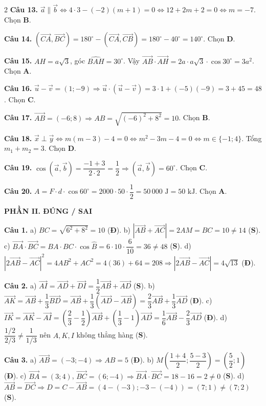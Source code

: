 \documentclass[10pt,a4paper]{article}
\begin{document}
\begin{multicols}{2}
\textbf{Câu 13.} $\vec{a} \parallel \vec{b} \Leftrightarrow 4\cdot 3 - (-2)(m + 1) = 0 \Leftrightarrow 12 + 2m + 2 = 0 \Leftrightarrow m = -7$. Chọn \textbf{B}.

\textbf{Câu 14.} $(\vec{CA}, \vec{BC}) = 180^\circ - (\vec{CA}, \vec{CB}) = 180^\circ - 40^\circ = 140^\circ$. Chọn \textbf{D}.

\textbf{Câu 15.} $AH = a\sqrt{3}$, góc $\widehat{BAH} = 30^\circ$. Vậy $\vec{AB}\cdot\vec{AH} = 2a\cdot a\sqrt{3}\cdot\cos 30^\circ = 3a^2$. Chọn \textbf{A}.

\textbf{Câu 16.} $\vec{u} - \vec{v} = (1; -9) \Rightarrow \vec{u}\cdot(\vec{u} - \vec{v}) = 3\cdot 1 + (-5)(-9) = 3 + 45 = 48$. Chọn \textbf{C}.

\textbf{Câu 17.} $\vec{AB} = (-6; 8) \Rightarrow AB = \sqrt{(-6)^2 + 8^2} = 10$. Chọn \textbf{B}.

\textbf{Câu 18.} $\vec{x}\perp\vec{y} \Leftrightarrow m(m - 3) - 4 = 0 \Leftrightarrow m^2 - 3m - 4 = 0 \Leftrightarrow m \in \{-1; 4\}$. Tổng $m_1 + m_2 = 3$. Chọn \textbf{D}.

\textbf{Câu 19.} $\cos(\vec{a}, \vec{b}) = \dfrac{-1 + 3}{2\cdot 2} = \dfrac{1}{2} \Rightarrow (\vec{a}, \vec{b}) = 60^\circ$. Chọn \textbf{C}.

\textbf{Câu 20.} $A = F\cdot d\cdot \cos 60^\circ = 2000\cdot 50\cdot \dfrac{1}{2} = 50\,000\text{ J} = 50\text{ kJ}$. Chọn \textbf{A}.

\textbf{\color{accent}PHẦN II. ĐÚNG / SAI}

\textbf{Câu 1.}
a) $BC = \sqrt{6^2 + 8^2} = 10$ (\textbf{Đ}).
b) $|\vec{AB} + \vec{AC}| = 2AM = BC = 10 \neq 14$ (\textbf{S}).
c) $\vec{BA}\cdot\vec{BC} = BA\cdot BC\cdot\cos\widehat{B} = 6\cdot 10\cdot \dfrac{6}{10} = 36 \neq 48$ (\textbf{S}).
d) $|2\vec{AB} - \vec{AC}|^2 = 4AB^2 + AC^2 = 4(36) + 64 = 208 \Rightarrow |2\vec{AB} - \vec{AC}| = 4\sqrt{13}$ (\textbf{Đ}).

\textbf{Câu 2.}
a) $\vec{AI} = \vec{AD} + \vec{DI} = \dfrac{1}{2}\vec{AB} + \vec{AD}$ (\textbf{S}).
b) $\vec{AK} = \vec{AB} + \dfrac{1}{3}\vec{BD} = \vec{AB} + \dfrac{1}{3}(\vec{AD} - \vec{AB}) = \dfrac{2}{3}\vec{AB} + \dfrac{1}{3}\vec{AD}$ (\textbf{Đ}).
c) $\vec{IK} = \vec{AK} - \vec{AI} = \left(\dfrac{2}{3} - \dfrac{1}{2}\right)\vec{AB} + \left(\dfrac{1}{3} - 1\right)\vec{AD} = \dfrac{1}{6}\vec{AB} - \dfrac{2}{3}\vec{AD}$ (\textbf{Đ}).
d) $\dfrac{1/2}{2/3} \neq \dfrac{1}{1/3}$ nên $A, K, I$ không thẳng hàng (\textbf{S}).

\textbf{Câu 3.}
a) $\vec{AB} = (-3; -4) \Rightarrow AB = 5$ (\textbf{Đ}).
b) $M\left(\dfrac{1+4}{2}; \dfrac{5-3}{2}\right) = \left(\dfrac{5}{2}; 1\right)$ (\textbf{Đ}).
c) $\vec{BA} = (3; 4)$, $\vec{BC} = (6; -4) \Rightarrow \vec{BA}\cdot\vec{BC} = 18 - 16 = 2 \neq 0$ (\textbf{S}).
d) $\vec{AB} = \vec{DC} \Rightarrow D = C - \vec{AB} = (4 - (-3); -3 - (-4)) = (7; 1) \neq (7; 2)$ (\textbf{S}).


\end{multicols}
\end{document}
